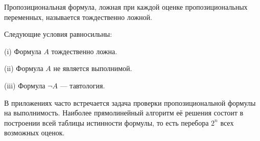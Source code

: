 \begin{definition}
	Пропозициональная формула, ложная при каждой
	оценке пропозициональных переменных, называется тождественно ложной.
\end{definition}

\begin{proposition}
	Следующие условия равносильны:

	(i) Формула $A$ тождественно ложна.

	(ii) Формула $A$ не является выполнимой.

	(iii) Формула $\lnot A$ — тавтология.
\end{proposition}

\begin{definition}
	В приложениях часто встречается задача проверки пропозициональной формулы на выполнимость. Наиболее
	прямолинейный алгоритм её решения состоит в построении всей таблицы истинности формулы, то есть перебора $2^n$
	всех возможных оценок.
\end{definition}
